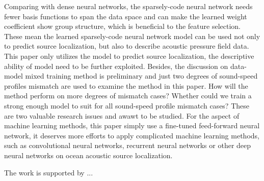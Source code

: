 Comparing with dense neural networks, the sparsely-code neural network needs fewer basis functions to span the data space and can make the learned weight coefficient show group structure, which is beneficial to the feature selection.
These mean the learned sparsely-code neural network model can be used not only to predict source localization, but also to describe acoustic pressure field data. This paper only utilizes the model to predict source localization, the descriptive ability of model need to be further exploited.
Besides, the discussion on data-model mixed training method is preliminary and just two degrees of sound-speed profiles mismatch are used to 
examine the method in this paper. How will the method perform on more degrees of mismatch cases? Whether could we train a strong enough model to suit for all sound-speed profile mismatch cases? These are two valuable research issues and awawt to be studied. 
For the aspect of machine learning methods, this paper simply use a fine-tuned feed-forward neural network, 
it deserves more efforts to apply complicated machine learning methods, such as convolutional neural networks, recurrent neural networks or other deep neural networks on ocean acoustic source localization.

\begin{acks}
The work is supported by ...

\end{acks}
